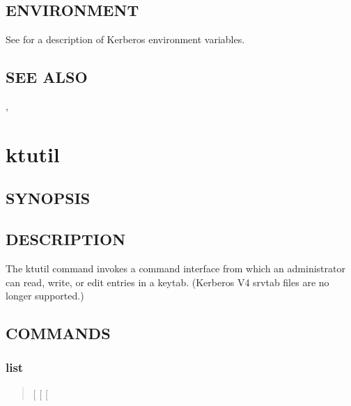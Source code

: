 \documentclass[letterpaper,10pt,english]{sphinxmanual}
\begin{document}
\subsection{ENVIRONMENT}
\label{\detokenize{admin/admin_commands/kproplog:environment}}
\sphinxAtStartPar
See  for a description of Kerberos environment
variables.


\subsection{SEE ALSO}
\label{\detokenize{admin/admin_commands/kproplog:see-also}}
\sphinxAtStartPar
{\hyperref[\detokenize{admin/admin_commands/kpropd:kpropd-8}]{}}, 

\sphinxstepscope


\section{ktutil}
\label{\detokenize{admin/admin_commands/ktutil:ktutil}}\label{\detokenize{admin/admin_commands/ktutil:ktutil-1}}\label{\detokenize{admin/admin_commands/ktutil::doc}}

\subsection{SYNOPSIS}
\label{\detokenize{admin/admin_commands/ktutil:synopsis}}
\sphinxAtStartPar
{}


\subsection{DESCRIPTION}
\label{\detokenize{admin/admin_commands/ktutil:description}}
\sphinxAtStartPar
The ktutil command invokes a command interface from which an
administrator can read, write, or edit entries in a keytab.  (Kerberos
V4 srvtab files are no longer supported.)


\subsection{COMMANDS}
\label{\detokenize{admin/admin_commands/ktutil:commands}}

\subsubsection{list}
\label{\detokenize{admin/admin_commands/ktutil:list}}\begin{quote}

\sphinxAtStartPar
{} {[}\sphinxstylestrong{\sphinxhyphen{}t}{]} {[}\sphinxstylestrong{\sphinxhyphen{}k}{]} {[}\sphinxstylestrong{\sphinxhyphen{}e}{]}
\end{quote}
\end{document}
